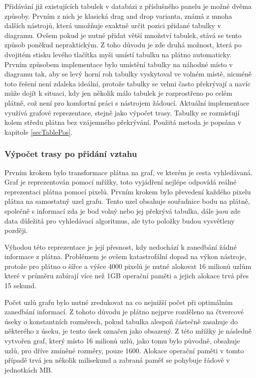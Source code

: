 \documentclass[czech,bachelor,public,dept460,male,oneside]{diploma}
\begin{document}
	Přidávání již existujících tabulek v databázi z příslušného panelu je možné dvěma způsoby. Prvním z nich je klasická drag and drop varianta, známá z mnoha dalších nástrojů, která umožňuje exaktně určit pozici přidané tabulky v diagramu. Ovšem pokud je nutné přidat větší množství tabulek, stává se tento způsob poněkud nepraktickým. Z toho důvodu je zde druhá možnost, která po dvojitém stisku levého tlačítka myši umístí tabulku na plátno automaticky. Prvním způsobem implementace bylo umístění tabulky na náhodné místo v diagramu tak, aby se levý horní roh tabulky vyskytoval ve volném místě, nicméně toto řešení není zdaleka ideální, protože tabulky se velmi často překrývají a navíc může dojít k situaci, kdy jen několik málo tabulek je rozprostřeno po celém plátně, což není pro komfortní práci s nástrojem žádoucí. Aktuální implementace využívá grafové reprezentace, stejně jako výpočet trasy. Tabulky se rozmísťují kolem středu plátna  bez vzájemného překrývání. Použitá metoda je popsána v kapitole \ref{secTablePos}.
	
		\subsubsection{Výpočet trasy po přidání vztahu} \label{secAStar}
		Prvním krokem bylo transformace plátna na graf, ve kterém je cesta vyhledávaná. Graf je reprezentován pomocí mřížky, toto vyjádření nejlépe odpovídá reálné reprezentaci plátna pomocí pixelů. Prvním krokem bylo převedení každého pixelu plátna na samostatný uzel grafu. Tento uzel obsahuje souřadnice bodu na plátně, společně s informací zda je bod volný nebo jej překrývá tabulka, dále jsou zde data důležitá pro vyhledávací algoritmus, ale tyto položky budou vysvětleny později.
		
		Výhodou této reprezentace je její přesnost, kdy nedochází k zanedbání žádné informace z plátna. Problémem je ovšem katastrofální dopad na výkon nástroje, protože pro plátno o šířce a výšce 4000 pixelů je nutné alokovat 16 milionů uzlům které v průměru zabírají více než 1GB operační paměti a jejich alokace trvá přes 15 sekund. 
		
		Počet uzlů grafu bylo nutné zredukovat na co nejnižší počet při optimálním zanedbání informací. Z tohoto důvodu je plátno nejprve rozděleno na čtvercové úseky o konstantních rozměrech, pokud tabulka alespoň částečně zasahuje do některého z úseku, je tento úsek označen jako obsazený. Z této mřížky je následně vytvořen graf, který místo 16 milionů uzlů, jako tomu bylo původně, obsahuje uzlů, pro dříve zmíněné rozměry, pouze 1600. Alokace operační paměti v tomto případě trvá jen několik milisekund a zabraná paměť se pohybuje řádově v jednotkách MB.
		
\end{document}
